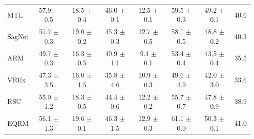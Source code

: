 \documentclass{article}
\begin{document}
\begin{center}
{\begin{tabular}{lccccccc}
MTL                  & 57.9 $\pm$ 0.5       & 18.5 $\pm$ 0.4       & 46.0 $\pm$ 0.1       & 12.5 $\pm$ 0.1       & 59.5 $\pm$ 0.3       & 49.2 $\pm$ 0.1       & 40.6                 \\
SagNet               & 57.7 $\pm$ 0.3       & 19.0 $\pm$ 0.2       & 45.3 $\pm$ 0.3       & 12.7 $\pm$ 0.5       & 58.1 $\pm$ 0.5       & 48.8 $\pm$ 0.2       & 40.3                 \\
ARM                  & 49.7 $\pm$ 0.3       & 16.3 $\pm$ 0.5       & 40.9 $\pm$ 1.1       & 9.4 $\pm$ 0.1        & 53.4 $\pm$ 0.4       & 43.5 $\pm$ 0.4       & 35.5                 \\
VREx                 & 47.3 $\pm$ 3.5       & 16.0 $\pm$ 1.5       & 35.8 $\pm$ 4.6       & 10.9 $\pm$ 0.3       & 49.6 $\pm$ 4.9       & 42.0 $\pm$ 3.0       & 33.6                 \\
RSC                  & 55.0 $\pm$ 1.2       & 18.3 $\pm$ 0.5       & 44.4 $\pm$ 0.6       & 12.2 $\pm$ 0.2       & 55.7 $\pm$ 0.7       & 47.8 $\pm$ 0.9       & 38.9                 \\ \midrule
EQRM                 & 56.1 $\pm$ 1.3       & 19.6 $\pm$ 0.1       & 46.3 $\pm$ 1.5       & 12.9 $\pm$ 0.3       & 61.1 $\pm$ 0.0       & 50.3 $\pm$ 0.1       & 41.0                 \\
\bottomrule
\end{tabular}}
\end{center}
\end{document}

